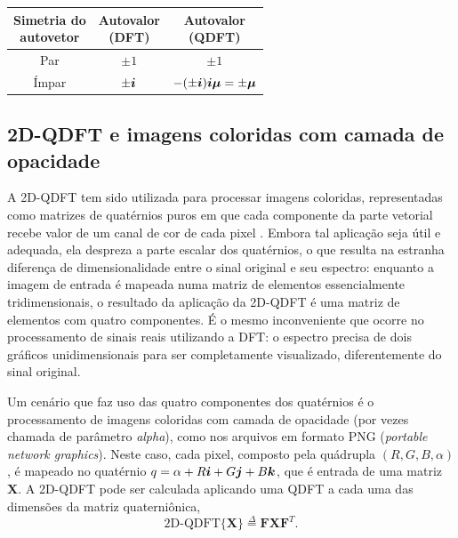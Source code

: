\begin{center}
\label{tab:01}
\begin{tabular}{ccc}
	\toprule
	\shortstack{Simetria do\\autovetor} & \shortstack{Autovalor\\(DFT)} & \shortstack{Autovalor\\(QDFT)} \\
	\midrule
	Par & $ \pm 1 $ & $ \pm 1 $ \\
	\'Impar & $ \pm \boldsymbol{i} $ & $ - (\pm \boldsymbol{i}) \boldsymbol{i} \boldsymbol{\mu} = \pm \boldsymbol{\mu} $\\
	\bottomrule
\end{tabular}
\end{center}

\subsection{2D-QDFT e imagens coloridas com camada de opacidade}
\label{subsec:2D_QDFT}

A 2D-QDFT tem sido utilizada para processar imagens coloridas, representadas como matrizes de quat\'ernios puros em que cada componente da parte vetorial recebe valor de um canal de cor de cada pixel \cite{lu20072d,ell2006hypercomplex,chen2018multiple}. Embora tal aplica\c c\~ao seja \'util e adequada, ela despreza a parte escalar dos quat\'ernios, o que resulta na estranha diferen\c ca de dimensionalidade entre o sinal original e seu espectro: enquanto a imagem de entrada \'e mapeada numa matriz de elementos essencialmente tridimensionais, o resultado da aplica\c c\~ao da 2D-QDFT \'e uma matriz de elementos com quatro componentes. \'E o mesmo inconveniente que ocorre no processamento de sinais reais utilizando a DFT: o espectro precisa de dois gr\'aficos unidimensionais para ser completamente visualizado, diferentemente do sinal original.

Um cen\'ario que faz uso das quatro componentes dos quat\'ernios \'e o processamento de imagens coloridas com camada de opacidade (por vezes chamada de par\^ametro \textit{alpha}), como nos arquivos em formato PNG (\textit{portable network graphics}). Neste caso, cada pixel, composto pela qu\'adrupla $ (R,G,B,\alpha) $, \'e mapeado no quat\'ernio $ q = \alpha + R \boldsymbol{i} + G \boldsymbol{j} + B \boldsymbol{k} $, que \'e entrada de uma matriz $ \mathbf{X} $. A 2D-QDFT pode ser calculada aplicando uma QDFT a cada uma das dimens\~oes da matriz quaterni\^onica,
\begin{equation}
\label{eq:2DQDFT}
\text{2D-QDFT}\{\mathbf{X} \} \overset{\Delta}{=} \mathbf{F} \mathbf{X} \mathbf{F}^T.
\end{equation}

